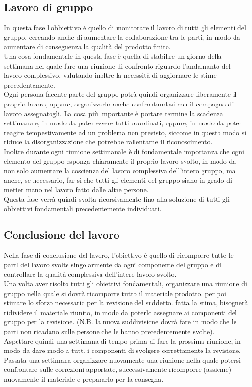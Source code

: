 \documentclass[11pt,a4paper]{article}
\begin{document}
	\subsection{Lavoro di gruppo}
	In questa fase l'obbiettivo è quello di monitorare il lavoro di tutti gli elementi del gruppo, cercando anche di aumentare la collaborazione tra le parti, in modo da aumentare di conseguenza la qualità del prodotto finito.\\
	Una cosa fondamentale in questa fase è quella di stabilire un giorno della settimana nel quale fare una riunione di confronto riguardo l'andamanto del lavoro complessivo, valutando inoltre la necessità di aggiornare le stime precedentemente.\\
	Ogni persona facente parte del gruppo potrà quindi organizzare liberamente il proprio lavoro, oppure, organizzarlo anche confrontandosi con il compagno di lavoro assegnatogli. La cosa più importante è portare termine la scadenza settimanale, in modo da poter essere tutti coordinati, oppure, in modo da poter reagire tempestivamente ad un problema non previsto, siccome in questo modo si riduce la disorganizzazione che potrebbe rallentarne il riconoscimento.\\
	Inoltre durante ogni riunione settimanale è di fondamentale importanza che ogni elemento del gruppo esponga chiaramente il proprio lavoro svolto, in modo da non solo aumentare la coscienza del lavoro complessiva dell'intero gruppo, ma anche, se necessario, far si che tutti gli elementi del gruppo siano in grado di metter mano nel lavoro fatto dalle altre persone.\\
	Questa fase verrà quindi svolta ricorsivamente fino alla soluzione di tutti gli obbiettivi fondamentali precedentemente individuati.\\
	
	\subsection{Conclusione del lavoro}
	Nella fase di conclusione del lavoro, l'obiettivo è quello di ricomporre tutte le parti del lavoro svolte singolarmente da ogni componente del gruppo e di controllare la qualità complessiva dell'intero lavoro svolto.\\
	Una volta aver risolto tutti gli obiettivi fondamentali, organizzare una riunione di gruppo nella quale si dovrà ricomporre tutto il materiale prodotto, per poi stimare lo sforzo necessario per la revisione del suddetto. fatta la stima, bisognerà ridividere il materiale riunito, in modo da poterlo assegnare ai componenti del gruppo per la revisione. (N.B. la nuova suddivisione dovrà fare in modo che le parti non ricadano sulle persone che le hanno precedentemente svolte).\\
	Aspettare quindi una settimana di tempo prima di fare la prossima riunione, in modo da dare modo a tutti i componenti di svolgere correttamente la revisione.\\
	Passata una settimana organizzare nuovamente una riunione nella quale potersi confrontare sulle correzioni apportate, successivamente ricomporre (assieme) nuovamente il materiale e prepararlo per la consegna. 
	
\end{document}
